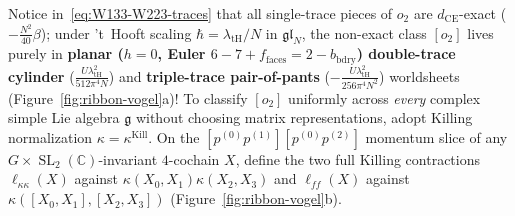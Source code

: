 \documentclass[11pt,letterpaper]{article}
\numberwithin{equation}{section}
\theoremstyle{plain}
\theoremstyle{definition}
\theoremstyle{remark}
\newcommand{\fg}{\mathfrak{g}}
\newcommand{\fgl}{\mathfrak{gl}}
\newcommand{\SL}{\operatorname{SL}}
\begin{document}
Notice in~\eqref{eq:W133-W223-traces} that all single-trace pieces of $o_2$ are $d_{\mathrm{CE}}$-exact ($-\frac{N^2}{40}\beta$); under 't~Hooft scaling $\hbar = \lambda_{\mathrm{tH}}/N$ in $\fgl_N$, the non-exact class $[o_2]$ lives purely in \textbf{planar ($h=0$, Euler $6 - 7 + f_{\mathrm{faces}} = 2 - b_{\mathrm{bdry}}$) double-trace cylinder} ($\frac{U\lambda_{\mathrm{tH}}^2}{512\pi^4 N}$) and \textbf{triple-trace pair-of-pants} ($-\frac{U\lambda_{\mathrm{tH}}^2}{256\pi^4 N^2}$) worldsheets (Figure~\ref{fig:ribbon-vogel}a)! To classify $[o_2]$ uniformly across \emph{every} complex simple Lie algebra $\fg$ without choosing matrix representations, adopt Killing normalization $\kappa = \kappa^{\mathrm{Kill}}$. On the $[p^{(0)}p^{(1)}][p^{(0)}p^{(2)}]$ momentum slice of any $G\times\SL_2(\mathbb{C})$-invariant $4$-cochain $X$, define the two full Killing contractions $\ell_{\kappa\kappa}(X)$ against $\kappa(X_0,X_1)\kappa(X_2,X_3)$ and $\ell_{ff}(X)$ against $\kappa([X_0,X_1],[X_2,X_3])$ (Figure~\ref{fig:ribbon-vogel}b).
\end{document}
